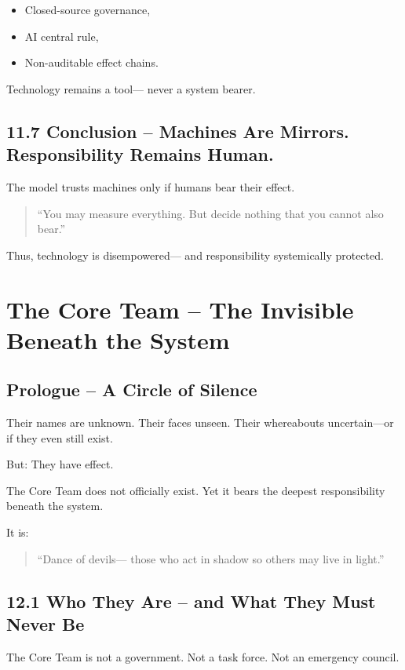 \documentclass[12pt,a4paper]{book}
\begin{document}
\begin{itemize}
    \item Closed-source governance,
    \item AI central rule,
    \item Non-auditable effect chains.
\end{itemize}

Technology remains a tool—  
never a system bearer.

\section*{11.7 Conclusion – Machines Are Mirrors. Responsibility Remains Human.}

The model trusts machines only  
if humans bear their effect.

\begin{quote}
“You may measure everything.  
But decide nothing  
that you cannot also bear.”  
\end{quote}

Thus, technology is disempowered—  
and responsibility systemically protected.

\chapter{The Core Team – The Invisible Beneath the System}

\section*{Prologue – A Circle of Silence}

Their names are unknown.  
Their faces unseen.  
Their whereabouts uncertain—or if they even still exist.

But: They have effect.

The Core Team does not officially exist.  
Yet it bears the deepest responsibility beneath the system.

It is:  
\begin{quote}
“Dance of devils—  
those who act in shadow so others may live in light.”  
\end{quote}

\section*{12.1 Who They Are – and What They Must Never Be}

The Core Team is not a government.  
Not a task force. Not an emergency council.
\end{document}
